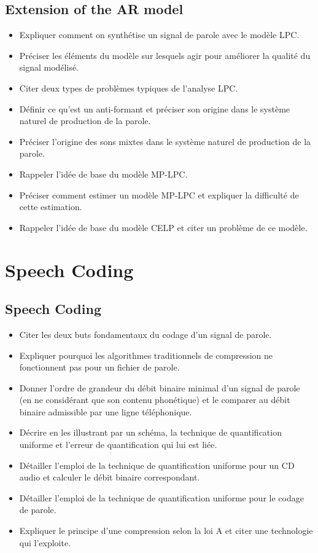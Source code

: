 \documentclass[letterpaper, 12pt]{article}
\begin{document}
	\subsection{Extension of the AR model}
		\begin{itemize}
			\setlength{\itemsep}{0pt}		
			\setlength{\parskip}{0pt}		
			\setlength{\parsep}{0pt}	
			\item Expliquer comment on synthétise un signal de parole avec le modèle LPC.
    		\item Préciser les éléments du modèle sur lesquels agir pour améliorer la qualité du signal modélisé.
    		\item Citer deux types de problèmes typiques de l'analyse LPC.
    		\item Définir ce qu'est un anti-formant et préciser son origine dans le système naturel de production de 
    			la parole.
    		\item Préciser l'origine des sons mixtes dans le système naturel de production de la parole.
    		\item Rappeler l'idée de base du modèle MP-LPC.
    		\item Préciser comment estimer un modèle MP-LPC et expliquer la difficulté de cette estimation.
    		\item Rappeler l'idée de base du modèle CELP et citer un problème de ce modèle.
		\end{itemize}
\section{Speech Coding}
	\subsection{Speech Coding}
		\begin{itemize}
			\setlength{\itemsep}{0pt}		
			\setlength{\parskip}{0pt}		
			\setlength{\parsep}{0pt}	
			\item Citer les deux buts fondamentaux du codage d'un signal de parole.
		    \item Expliquer pourquoi les algorithmes traditionnels de compression ne fonctionnent pas pour un fichier 
		    	de parole.
		    \item Donner l'ordre de grandeur du débit binaire minimal d'un signal de parole (en ne considérant que son 
		    	contenu phonétique) et le comparer au débit binaire admissible par une ligne téléphonique.
		    \item Décrire en les illustrant par un schéma, la technique de quantification uniforme et l'erreur de 
		    	quantification qui lui est liée.
		    \item Détailler l'emploi de la technique de quantification uniforme pour un CD audio et calculer le débit 
		    	binaire correspondant.
		    \item Détailler l'emploi de la technique de quantification uniforme pour le codage de parole.
		    \item Expliquer le principe d'une compression selon la loi A et citer une technologie qui l'exploite.
		\end{itemize}
\end{document}
